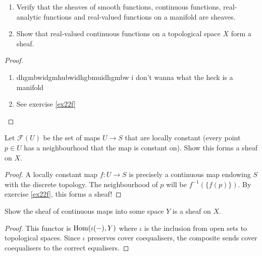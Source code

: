 \documentclass{article}
\begin{document}
\begin{exercise}
    \begin{enumerate}
        \item
            Verify that the sheaves of smooth functions, continuous functions, real-analytic functions and real-valued functions on a manifold are sheaves.
        \item
            Show that real-valued continuous functions on a topological space \(X\) form a sheaf.
    \end{enumerate}
\end{exercise}
\begin{proof}
    \begin{enumerate}
        \item
            dhgmbwidgmhubwidhgbmuidhgmbw i don't wanna what the heck is a manifold
        \item
            See exercise \ref{ex22f}
    \end{enumerate}
\end{proof}

\begin{exercise}
    Let \(\mathscr{F}(U)\) be the set of maps \(U \to S\) that are locally constant (every point \(p \in U\) has a neighbourhood that the map is constant on).
    Show this forms a sheaf on \(X\).
\end{exercise}
\begin{proof}
    A locally constant map \(f : U \to S\) is precisely a continuous map endowing \(S\) with the discrete topology.
    The neighbourhood of \(p\) will be \(f^{-1}(\{f(p)\})\).
    By exercise \ref{ex22f}, this forms a sheaf!
\end{proof}

\begin{exercise}\label{ex22f}
    Show the sheaf of continuous maps into some space \(Y\) is a sheaf on \(X\).
\end{exercise}
\begin{proof}
    This functor is \(\operatorname{Hom}(\iota(-), Y)\) where \(\iota\) is the inclusion from open sets to topological spaces.
    Since \(\iota\) preserves cover coequalisers, the composite sends cover coequalisers to the correct equalisers.
\end{proof}
\end{document}
